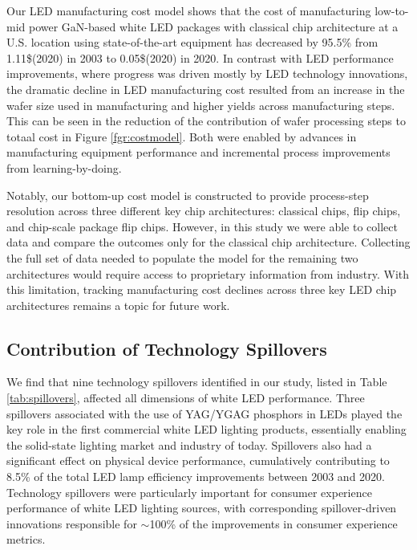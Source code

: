 \documentclass[twoside,twocolumn,9pt]{article}
\begin{document}
Our LED manufacturing cost model shows that the cost of manufacturing low-to-mid power GaN-based white LED packages with classical chip architecture at a U.S. location using state-of-the-art equipment has decreased by 95.5\% from 1.11\$(2020) in 2003 to 0.05\$(2020) in 2020. In contrast with LED performance improvements, where progress was driven mostly by LED technology innovations, the dramatic decline in LED manufacturing cost resulted from an increase in the wafer size used in manufacturing and higher yields across manufacturing steps. This can be seen in the reduction of the contribution of wafer processing steps to  totaal cost in Figure \ref{fgr:costmodel}. Both were enabled by advances in manufacturing equipment performance and incremental process improvements from learning-by-doing.

Notably, our bottom-up cost model is constructed to provide process-step resolution across three different key chip architectures: classical chips, flip chips, and chip-scale package flip chips. However, in this study we were able to collect data and compare the outcomes only for the classical chip architecture. Collecting the full set of data needed to populate the model for the remaining two architectures would require access to proprietary information from industry. With this limitation, tracking manufacturing cost declines across three key LED chip architectures remains a topic for future work.

\subsection{Contribution of Technology Spillovers}
\label{subsec:spillovers}

We find that nine technology spillovers identified in our study, listed in Table \ref{tab:spillovers}, affected all dimensions of white LED performance. Three spillovers associated with the use of YAG/YGAG phosphors in LEDs played the key role in the first commercial white LED lighting products, essentially enabling the solid-state lighting market and industry of today. Spillovers also had a significant effect on physical device performance, cumulatively contributing to 8.5\% of the total LED lamp efficiency improvements between 2003 and 2020. Technology spillovers were particularly important for consumer experience performance of white LED lighting sources, with corresponding spillover-driven innovations responsible for $\sim$100\% of the improvements in consumer experience metrics. 
\end{document}
